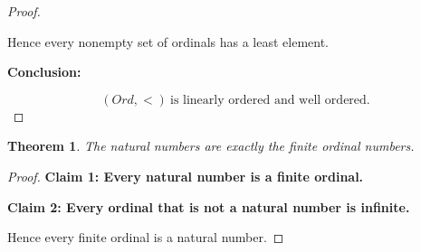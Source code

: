\documentclass[10pt,a4paper]{book}
\newtheorem{theorem}{Theorem}[section]
\begin{document}
\begin{proof}
\begin{fitchproof}[arrayenv=tabular]
         
         

    \end{fitchproof}

    Hence every nonempty set of ordinals has a least element.

    \medskip

    \textbf{Conclusion:}

    \[
        (Ord,<)\ \text{is linearly ordered and well ordered.}
    \]

\end{proof}

\begin{theorem}
    The natural numbers are exactly the finite ordinal numbers.
\end{theorem}

\begin{proof}

    \textbf{Claim 1: Every natural number is a finite ordinal.}

    \begin{fitchproof}[arrayenv=tabular]

         
         

    \end{fitchproof}

    \medskip

    \textbf{Claim 2: Every ordinal that is not a natural number is infinite.}

    \begin{fitchproof}[arrayenv=tabular]

         
         
         
         
         
         
         
         \by{$\omega\subseteq\alpha$}{}

    \end{fitchproof}

    Hence every finite ordinal is a natural number.

\end{proof}
\end{document}
